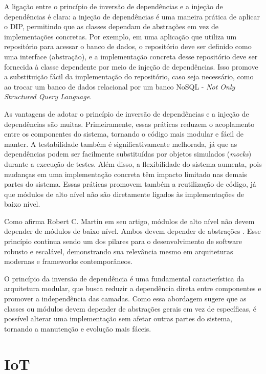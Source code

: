 A ligação entre o princípio de inversão de dependências e a injeção de dependências é clara: a injeção de dependências é uma maneira prática de aplicar o DIP, permitindo que as classes dependam de abstrações em vez de implementações concretas. Por exemplo, em uma aplicação que utiliza um repositório para acessar o banco de dados, o repositório deve ser definido como uma interface (abstração), e a implementação concreta desse repositório deve ser fornecida à classe dependente por meio de injeção de dependências. Isso promove a substituição fácil da implementação do repositório, caso seja necessário, como ao trocar um banco de dados relacional por um banco NoSQL - \textit{Not Only Structured Query Language}.

As vantagens de adotar o princípio de inversão de dependências e a injeção de dependências são muitas. Primeiramente, essas práticas reduzem o acoplamento entre os componentes do sistema, tornando o código mais modular e fácil de manter. A testabilidade também é significativamente melhorada, já que as dependências podem ser facilmente substituídas por objetos simulados (\textit{mocks}) durante a execução de testes. Além disso, a flexibilidade do sistema aumenta, pois mudanças em uma implementação concreta têm impacto limitado nas demais partes do sistema. Essas práticas promovem também a reutilização de código, já que módulos de alto nível não são diretamente ligados às implementações de baixo nível.

Como afirma Robert C. Martin em seu artigo, módulos de alto nível não devem depender de módulos de baixo nível. Ambos devem depender de abstrações \cite{martin2000design}. Esse princípio continua sendo um dos pilares para o desenvolvimento de software robusto e escalável, demonstrando sua relevância mesmo em arquiteturas modernas e frameworks contemporâneos.

O princípio da inversão de dependência é uma fundamental característica da arquitetura modular, que busca reduzir a dependência direta entre componentes e promover a independência das camadas. Como essa abordagem sugere que as classes ou módulos devem depender de abstrações gerais em vez de específicas, é possível alterar uma implementação sem afetar outras partes do sistema, tornando a manutenção e evolução mais fáceis.

\section{IoT}

